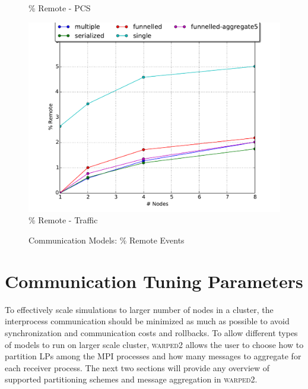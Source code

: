 \documentclass[11pt]{book}
\begin{document}
\begin{figure}
\begin{minipage}{.5\textwidth}
\begin{center}
      \% Remote - PCS \\
    \end{center}
  \end{minipage}
  \centering
  \begin{minipage}{.5\textwidth}
    \begin{center}
      \includegraphics[width=\textwidth,keepaspectratio,quiet]{figs/partitioning_communication/communication_traffic_premote.pdf} \\
      \% Remote - Traffic \\
    \end{center}
  \end{minipage}%
  \hfill
  \caption{Communication Models: \% Remote Events}\label{communication_model_premote} 
\end{figure}

\section{Communication Tuning Parameters}

To effectively scale simulations to larger number of nodes in a cluster, the interprocess communication
should be minimized as much as possible to avoid synchronization and communication costs
and rollbacks.  To allow different types of models to run on larger scale cluster, \textsc{warped2}
allows the user to choose how to partition LPs among the MPI processes and how many messages
to aggregate for each receiver process.  The next two sections will provide any overview
of supported partitioning schemes and message aggregation in \textsc{warped2}.
\end{document}
